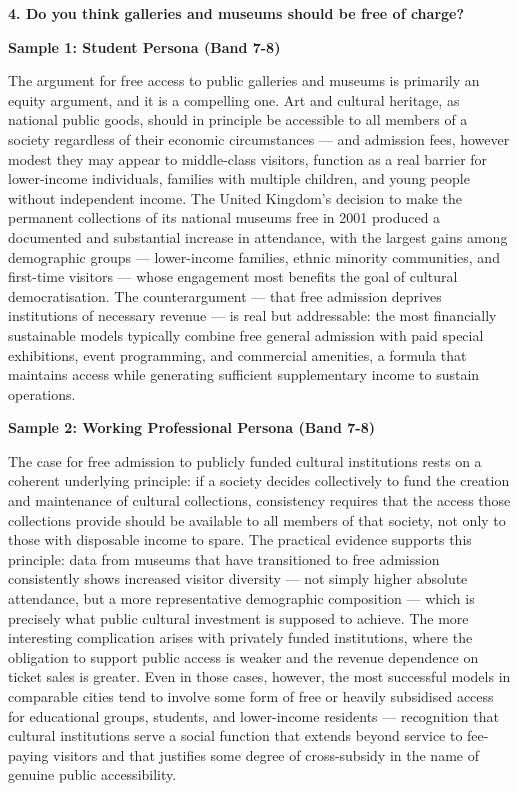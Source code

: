 \separator

\begin{ieltsquestion}
\textbf{4. Do you think galleries and museums should be free of charge?}
\end{ieltsquestion}
\textbf{Sample 1: Student Persona (Band 7-8)}

The argument for free access to public galleries and museums is primarily an equity argument, and it is a compelling one. Art and cultural heritage, as national public goods, should in principle be accessible to all members of a society regardless of their economic circumstances — and admission fees, however modest they may appear to middle-class visitors, function as a real barrier for lower-income individuals, families with multiple children, and young people without independent income. The United Kingdom's decision to make the permanent collections of its national museums free in 2001 produced a documented and substantial increase in attendance, with the largest gains among demographic groups — lower-income families, ethnic minority communities, and first-time visitors — whose engagement most benefits the goal of cultural democratisation. The counterargument — that free admission deprives institutions of necessary revenue — is real but addressable: the most financially sustainable models typically combine free general admission with paid special exhibitions, event programming, and commercial amenities, a formula that maintains access while generating sufficient supplementary income to sustain operations.

\textbf{Sample 2: Working Professional Persona (Band 7-8)}

The case for free admission to publicly funded cultural institutions rests on a coherent underlying principle: if a society decides collectively to fund the creation and maintenance of cultural collections, consistency requires that the access those collections provide should be available to all members of that society, not only to those with disposable income to spare. The practical evidence supports this principle: data from museums that have transitioned to free admission consistently shows increased visitor diversity — not simply higher absolute attendance, but a more representative demographic composition — which is precisely what public cultural investment is supposed to achieve. The more interesting complication arises with privately funded institutions, where the obligation to support public access is weaker and the revenue dependence on ticket sales is greater. Even in those cases, however, the most successful models in comparable cities tend to involve some form of free or heavily subsidised access for educational groups, students, and lower-income residents — recognition that cultural institutions serve a social function that extends beyond service to fee-paying visitors and that justifies some degree of cross-subsidy in the name of genuine public accessibility.


